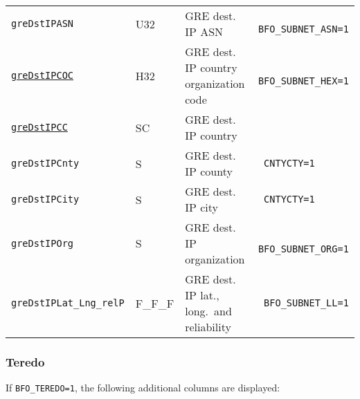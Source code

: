 \documentclass[documentation]{subfiles}
\begin{document}
\begin{longtable}{>{\tt}lll>{\tt\small}l}
    greDstIPASN                    & U32        & GRE dest. IP ASN                           & BFO\_SUBNET\_ASN=1\\
    \hyperref[subnet]{greDstIPCOC} & H32        & GRE dest. IP country organization code     & BFO\_SUBNET\_HEX=1\\
    \hyperref[subnet]{greDstIPCC}  & SC         & GRE dest. IP country                       & \\
    greDstIPCnty                   & S          & GRE dest. IP county                        & CNTYCTY=1\\
    greDstIPCity                   & S          & GRE dest. IP city                          & CNTYCTY=1\\
    greDstIPOrg                    & S          & GRE dest. IP organization                  & BFO\_SUBNET\_ORG=1\\
    greDstIPLat\_Lng\_relP         & F\_F\_F    & GRE dest. IP lat., long.\ and reliability  & BFO\_SUBNET\_LL=1\\
    \bottomrule
\end{longtable}

\newpage
\subsubsection{Teredo}\label{s:bfo:teredo}

If {\tt BFO\_TEREDO=1}, the following additional columns are displayed:
\end{document}
